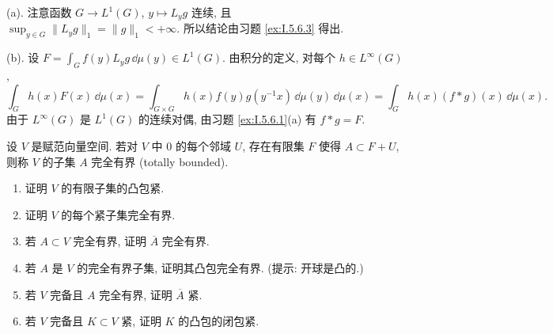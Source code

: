 \begin{solution}
(a). 注意函数 $G \to L^1(G)$, $y \longmapsto L_yg$ 连续, 且 $\sup_{y \in G}\|L_yg\|_1 = \|g\|_1 < +\infty$. 所以结论由习题 \ref{ex:I.5.6.3} 得出.

(b). 设 $F = \int_G f(y)L_yg\,\dd\mu(y) \in L^1(G)$. 由积分的定义, 对每个 $h \in L^{\infty}(G)$,
\[
\int_G h(x)F(x)\,\dd\mu(x) = \int_{G \times G}h(x)f(y)g(y^{-1}x)\,\dd\mu(y)\,\dd\mu(x) = \int_G h(x)(f * g)(x)\,\dd\mu(x).
\]
由于 $L^{\infty}(G)$ 是 $L^1(G)$ 的连续对偶, 由习题 \ref{ex:I.5.6.1}(a) 有 $f * g = F$.
\end{solution}

\begin{exercise}[完全有界与凸包]
\label{ex:I.5.6.5}
设 $V$ 是赋范向量空间. 若对 $V$ 中 $0$ 的每个邻域 $U$, 存在有限集 $F$ 使得 $A \subset F + U$, 则称 $V$ 的子集 $A$ 完全有界 (totally bounded).
\begin{enumerate}
\item[(a)] 证明 $V$ 的有限子集的凸包紧.
\item[(b)] 证明 $V$ 的每个紧子集完全有界.
\item[(c)] 若 $A \subset V$ 完全有界, 证明 $\overline{A}$ 完全有界.
\item[(d)] 若 $A$ 是 $V$ 的完全有界子集, 证明其凸包完全有界. (提示: 开球是凸的.)
\item[(e)] 若 $V$ 完备且 $A$ 完全有界, 证明 $\overline{A}$ 紧.
\item[(f)] 若 $V$ 完备且 $K \subset V$ 紧, 证明 $K$ 的凸包的闭包紧.
\end{enumerate}
\end{exercise}

